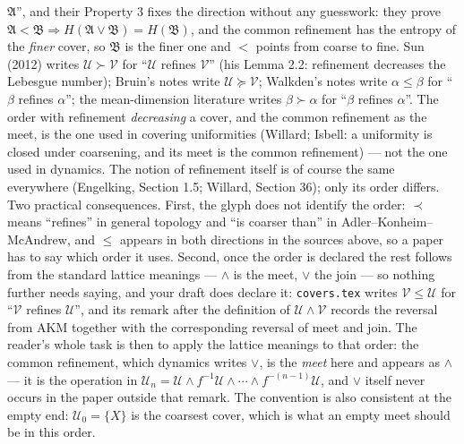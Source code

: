 \documentclass[
]{article}
\begin{document}
\begin{itemize}
  \(\mathfrak{A}\)'', and their Property 3 fixes the direction without
  any guesswork: they prove
  \(\mathfrak{A}<\mathfrak{B}\Rightarrow H(\mathfrak{A}\vee\mathfrak{B})=H(\mathfrak{B})\),
  and the common refinement has the entropy of the \emph{finer} cover,
  so \(\mathfrak{B}\) is the finer one and \(<\) points from coarse to
  fine. Sun (2012) writes \(\mathcal U\succ\mathcal V\) for
  ``\(\mathcal U\) refines \(\mathcal V\)'' (his Lemma 2.2: refinement
  decreases the Lebesgue number); Bruin's notes write
  \(\mathcal U\succeq\mathcal V\); Walkden's notes write
  \(\alpha\le\beta\) for ``\(\beta\) refines \(\alpha\)''; the
  mean-dimension literature writes \(\beta\succ\alpha\) for ``\(\beta\)
  refines \(\alpha\)''. The order with refinement \emph{decreasing} a
  cover, and the common refinement as the meet, is the one used in
  covering uniformities (Willard; Isbell: a uniformity is closed under
  coarsening, and its meet is the common refinement) --- not the one
  used in dynamics. The notion of refinement itself is of course the
  same everywhere (Engelking, Section 1.5; Willard, Section 36); only its order
  differs. Two practical consequences. First, the glyph does not
  identify the order: \(\prec\) means ``refines'' in general topology
  and ``is coarser than'' in Adler--Konheim--McAndrew, and \(\le\)
  appears in both directions in the sources above, so a paper has to say
  which order it uses. Second, once the order is declared the rest
  follows from the standard lattice meanings --- \(\wedge\) is the meet,
  \(\vee\) the join --- so nothing further needs saying, and your draft
  does declare it: \texttt{covers.tex} writes
  \(\mathcal V\le\mathcal U\) for ``\(\mathcal V\) refines
  \(\mathcal U\)'', and its remark after the definition of
  \(\mathcal U\wedge\mathcal V\) records the reversal from AKM together
  with the corresponding reversal of meet and join. The reader's whole
  task is then to apply the lattice meanings to that order: the common
  refinement, which dynamics writes \(\vee\), is the \emph{meet} here
  and appears as \(\wedge\) --- it is the operation in
  \(\mathcal U_n=\mathcal U\wedge f^{-1}\mathcal U\wedge\cdots\wedge f^{-(n-1)}\mathcal U\),
  and \(\vee\) itself never occurs in the paper outside that remark. The
  convention is also consistent at the empty end: \(\mathcal U_0=\{X\}\)
  is the coarsest cover, which is what an empty meet should be in this
  order.
\end{itemize}
\end{document}
